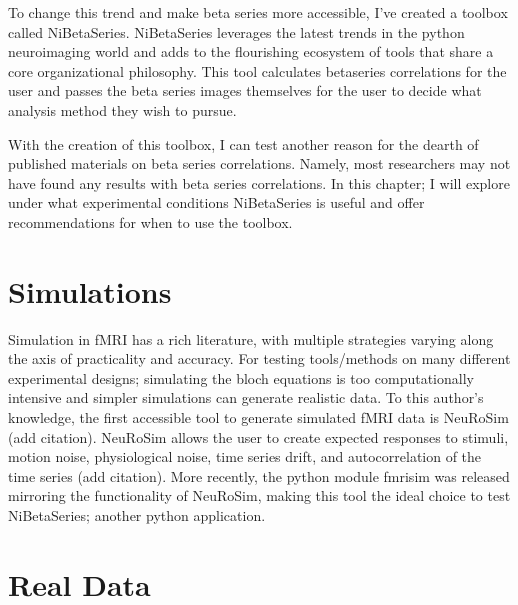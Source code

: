 \documentclass[phd,appendix,figures]{uithesis}
\begin{document}
To change this trend and make beta series more accessible, I've created a toolbox called NiBetaSeries.
NiBetaSeries leverages the latest trends in the python neuroimaging world and adds to the flourishing
ecosystem of tools that share a core organizational philosophy.
This tool calculates betaseries correlations for the user and passes the beta series images themselves
for the user to decide what analysis method they wish to pursue.

With the creation of this toolbox, I can test another reason for the dearth of published materials on
beta series correlations.
Namely, most researchers may not have found any results with beta series correlations.
In this chapter; I will explore under what experimental conditions NiBetaSeries is useful and offer
recommendations for when to use the toolbox.

\section{Simulations}
Simulation in fMRI has a rich literature, with multiple strategies varying along the axis
of practicality and accuracy.
For testing tools/methods on many different experimental designs; simulating the bloch equations
is too computationally intensive and simpler simulations can generate realistic data.
To this author's knowledge, the first accessible tool to generate simulated fMRI data is NeuRoSim (add citation).
NeuRoSim allows the user to create expected responses to stimuli, motion noise, physiological noise,
time series drift, and autocorrelation of the time series (add citation).
More recently, the python module fmrisim was released mirroring the functionality of NeuRoSim, making this tool
the ideal choice to test NiBetaSeries; another python application.


\section{Real Data}

\end{document}
